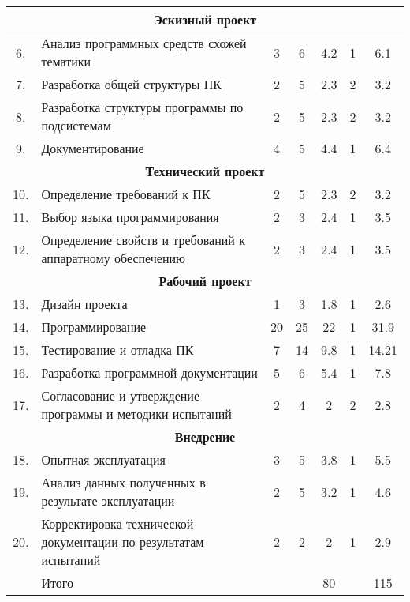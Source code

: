 \begin{center}
\begin{longtable}{|c|p{3.5cm}|c|c|c|c|c|}
\multicolumn{7}{|c|}{\textbf{Эскизный проект}} \\ \hline

6. & Анализ программных средств схожей тематики & 3 & 6 & 4.2 & 1 & 6.1 \\ \hline
7. & Разработка общей структуры ПК & 2 & 5 & 2.3 & 2 & 3.2 \\ \hline
8. & Разработка структуры программы по подсистемам & 2 & 5 & 2.3 & 2 & 3.2 \\ \hline
9. & \hfill{}Документирование & 4 & 5 & 4.4 & 1 & 6.4 \\ \hline

\multicolumn{7}{|c|}{\textbf{Технический проект}} \\ \hline

10. & Определение требований к ПК & 2 & 5 & 2.3 & 2 & 3.2 \\ \hline
11. & Выбор языка программирования & 2 & 3 & 2.4 & 1 & 3.5 \\ \hline
12. & Определение свойств и требований к аппаратному обеспечению & 2 & 3 & 2.4 & 1 & 3.5 \\ \hline

\multicolumn{7}{|c|}{\textbf{Рабочий проект}} \\ \hline

13. & Дизайн проекта & 1 & 3 & 1.8 & 1 & 2.6 \\ \hline
14. & \hfill{}Программирование & 20 & 25 & 22 & 1 & 31.9 \\ \hline
15. & Тестирование и отладка ПК & 7 & 14 & 9.8 & 1 & 14.21 \\ \hline
16. & Разработка программной документации & 5 & 6 & 5.4 & 1 & 7.8 \\ \hline
17. & Согласование и утверждение программы и методики испытаний & 2 & 4 & 2 & 2 & 2.8 \\ \hline

\multicolumn{7}{|c|}{\textbf{Внедрение}} \\ \hline

18. & Опытная эксплуатация & 3 & 5 & 3.8 & 1 & 5.5 \\ \hline
19. & Анализ данных полученных в результате эксплуатации & 2 & 5 & 3.2 & 1 & 4.6 \\ \hline
20. & Корректировка технической документации по результатам испытаний & 2 & 2 & 2 & 1 & 2.9 \\ \hline

    & Итого & & & 80 & & 115 \\ \hline %

\hline
\end{longtable}
\end{center}

